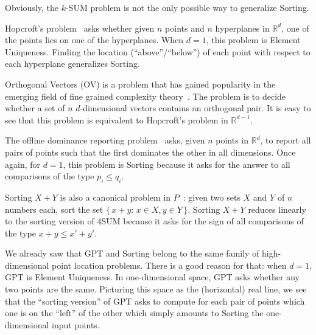 Obviously, the \(k\)-SUM problem is not the only possible way to generalize
Sorting.

Hopcroft's problem~\cite[Section~1]{Er96} asks whether given \(n\) points and \(n\) hyperplanes in
\(\mathbb{R}^d\), one of the points lies on one of the hyperplanes. When
\(d=1\), this problem is Element Uniqueness. Finding the location
(``above''/``below'')
of each point with respect to each hyperplane generalizes Sorting.

Orthogonal Vectors (OV) is a problem that has gained popularity in the emerging field
of fine grained complexity theory~\cite{Wil05}. The problem is to decide
whether a set of \(n\) \(d\)-dimensional vectors contains an orthogonal pair.
It is easy to see that this problem is equivalent to Hopcroft's problem in
\(\mathbb{R}^{d-1}\).

The offline dominance reporting problem~\cite[Section~2]{Cha08} asks,
given \(n\) points in \(\mathbb{R}^d\),
to report all pairs of points such that the first dominates the other in all
dimensions. Once again, for \(d=1\), this problem is Sorting because it asks
for the answer to all comparisons of the type \(p_i \leq q_i\).

Sorting \(X+Y\) is also a canonical problem in \(P\)~\cite{HPSS75,Fr76}:
given two sets \(X\) and \( Y \) of \( n \) numbers each, sort the set \( \{\,
x + y \colon\, x \in X, y \in Y\,\} \). Sorting \(X+Y\) reduces linearly to the
sorting version of 4SUM because it asks for the sign of all comparisons of the
type \(x+y \leq x'+y'\).

We already saw that GPT and Sorting belong to the same family of
high-dimensional point location problems. There is a good reason for that: when
\(d=1\), GPT is Element Uniqueness. In one-dimensional space, GPT
asks whether any two points are the same. Picturing this space as
the (horizontal) real line, we see that the ``sorting version'' of GPT asks to
compute for each pair of points which one is on the ``left'' of the other which
simply amounts to Sorting the one-dimensional input points.
